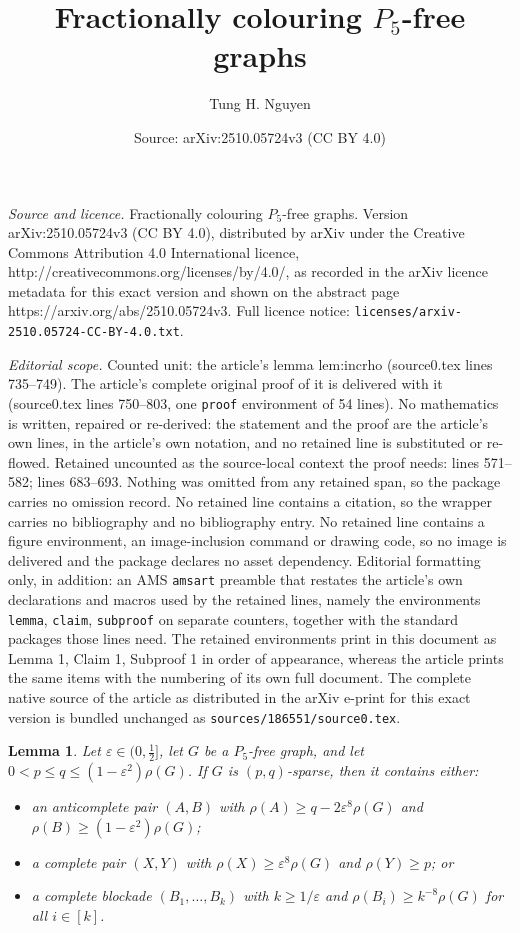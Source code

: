 \documentclass[10pt,a4paper]{amsart}
\title{Fractionally colouring $P_5$-free graphs}
\author{Tung H. Nguyen}
\date{Source: arXiv:2510.05724v3 (CC BY 4.0)}
\newtheorem{lemma}{Lemma}
\newcommand{\eps}{\varepsilon}
\begin{document}
\maketitle

\noindent\emph{Source and licence.} Fractionally colouring $P_5$-free graphs. Version arXiv:2510.05724v3 (CC BY 4.0), distributed by arXiv under the Creative Commons Attribution 4.0 International licence, http://creativecommons.org/licenses/by/4.0/, as recorded in the arXiv licence metadata for this exact version and shown on the abstract page https://arxiv.org/abs/2510.05724v3. Full licence notice: \texttt{licenses/arxiv-2510.05724-CC-BY-4.0.txt}.\par\smallskip

\noindent\textit{Editorial scope.} Counted unit: the article's lemma lem:incrho (source0.tex lines 735--749). The article's complete original proof of it is delivered with it (source0.tex lines 750--803, one \texttt{proof} environment of 54 lines). No mathematics is written, repaired or re-derived: the statement and the proof are the article's own lines, in the article's own notation, and no retained line is substituted or re-flowed.  Retained uncounted as the source-local context the proof needs: lines 571--582; lines 683--693.  Nothing was omitted from any retained span, so the package carries no omission record.  No retained line contains a citation, so the wrapper carries no bibliography and no bibliography entry.  No retained line contains a figure environment, an image-inclusion command or drawing code, so no image is delivered and the package declares no asset dependency.  Editorial formatting only, in addition: an AMS \texttt{amsart} preamble that restates the article's own declarations and macros used by the retained lines, namely the environments \texttt{lemma}, \texttt{claim}, \texttt{subproof} on separate counters, together with the standard packages those lines need.  The retained environments print in this document as Lemma 1, Claim 1, Subproof 1 in order of appearance, whereas the article prints the same items with the numbering of its own full document.  The complete native source of the article as distributed in the arXiv e-print for this exact version is bundled unchanged as \texttt{sources/186551/source0.tex}.
	\begin{lemma}
		\label{lem:anti}
		Let $\eps\in(0,\frac12]$, let $G$ be a $P_5$-free graph, and let $0<p\le q\le(1-\eps^2)\rho(G)$. 
		If $G$ is $(p,q)$-sparse, then it contains either:
		\begin{itemize}
			\item an anticomplete pair $(A,B)$ with $\rho(A)\ge q-2\eps^8\rho(G)$ and $\rho(B)\ge(1-\eps^2)\rho(G)$;
			
			\item a complete pair $(X,Y)$ with $\rho(X)\ge \eps^8\rho(G)$ and $\rho(Y)\ge p$; or
			
			\item a complete blockade $(B_1,\ldots,B_k)$ with $k\ge1/\eps$ and $\rho(B_i)\ge k^{-8}\rho(G)$ for all $i\in[k]$.
		\end{itemize}
	\end{lemma}
\end{document}

